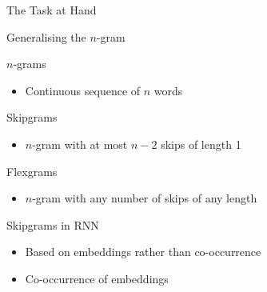 \begin{frame}{The Task at Hand}
\data
\medskip
{}
\end{frame}

\begin{frame}{Generalising the $n$-gram}
    \begin{block}{$n$-grams}
        \begin{itemize}
            \item Continuous sequence of $n$ words
        \end{itemize}
    \end{block}
    
    \begin{block}{Skipgrams}
        \begin{itemize}
            \item $n$-gram with at most $n-2$ skips of length 1
        \end{itemize}
    \end{block}
    
    \begin{block}{Flexgrams}
        \begin{itemize}
            \item $n$-gram with any number of skips of any length
        \end{itemize}
    \end{block}
    \bigskip
    \begin{block}{Skipgrams in RNN}
        \begin{itemize}
            \item Based on embeddings rather than co-occurrence
            \item Co-occurrence of embeddings
        \end{itemize}
    \end{block}
\end{frame}

